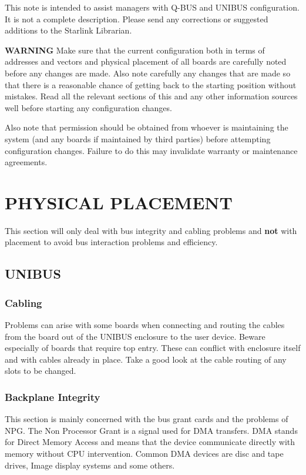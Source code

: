 This note is intended to assist managers with Q-BUS and UNIBUS  configuration.
It is not a complete description.
Please send any corrections or suggested additions to the Starlink Librarian.

{\bf WARNING} Make sure that the current  configuration 
both in terms of addresses and vectors and physical placement
 of all boards are carefully noted before any changes are made.
Also note carefully any changes that are made so that there is a reasonable
chance of getting back to the starting position without mistakes.
 Read all the relevant sections of this and any other information
 sources well before starting any configuration changes.

Also note that permission should be obtained from whoever is maintaining
the system (and any boards if maintained by third parties) before attempting
configuration changes.
Failure to do this may invalidate warranty or maintenance agreements.


\section{PHYSICAL PLACEMENT}
This section will only deal with bus integrity and cabling
 problems and {\bf not} with placement to avoid bus interaction problems and
 efficiency.

	
\subsection{UNIBUS}
\subsubsection{Cabling}
Problems can arise with some boards when connecting and routing the
 cables from the board out of the UNIBUS enclosure to the user device.
 Beware especially of boards that require top entry.
These can conflict with  enclosure itself and with cables already in place.
Take a good look at the cable routing of any slots to be changed.

\subsubsection{Backplane Integrity}
This section is mainly concerned with the bus grant cards and the
 problems of NPG.
The Non Processor Grant is a signal used for DMA transfers.
DMA stands for Direct Memory Access and means that the device communicate
directly with memory without CPU intervention.
Common DMA devices are disc and tape drives, Image display systems and some
others.

